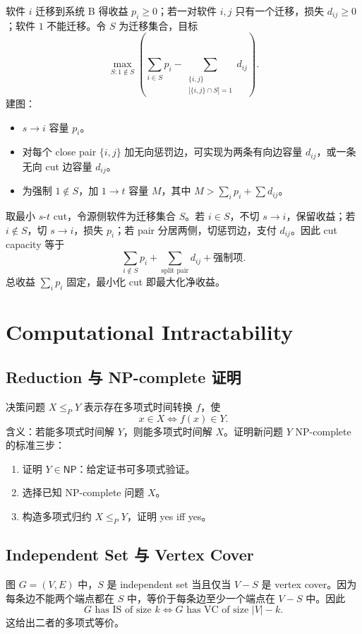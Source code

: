 \documentclass[UTF8,a4paper,11pt]{ctexart}
\newcommand{\NP}{\mathsf{NP}}
\begin{document}
软件 $i$ 迁移到系统 B 得收益 $p_i\ge 0$；若一对软件 $i,j$ 只有一个迁移，损失 $d_{ij}\ge 0$；软件 $1$ 不能迁移。令 $S$ 为迁移集合，目标
\[
\max_{S:1\notin S}\left(\sum_{i\in S}p_i-\sum_{\substack{\{i,j\}\\ |\{i,j\}\cap S|=1}}d_{ij}\right).
\]
建图：
\begin{itemize}
  \item $s\to i$ 容量 $p_i$。
  \item 对每个 close pair $\{i,j\}$ 加无向惩罚边，可实现为两条有向边容量 $d_{ij}$，或一条无向 cut 边容量 $d_{ij}$。
  \item 为强制 $1\notin S$，加 $1\to t$ 容量 $M$，其中 $M>\sum_i p_i+\sum d_{ij}$。
\end{itemize}
取最小 $s$-$t$ cut，令源侧软件为迁移集合 $S$。若 $i\in S$，不切 $s\to i$，保留收益；若 $i\notin S$，切 $s\to i$，损失 $p_i$；若 pair 分居两侧，切惩罚边，支付 $d_{ij}$。因此 cut capacity 等于
\[
\sum_{i\notin S}p_i+\sum_{\text{split pair}}d_{ij}+\text{强制项}.
\]
总收益 $\sum_i p_i$ 固定，最小化 cut 即最大化净收益。

\section{Computational Intractability}

\subsection{Reduction 与 NP-complete 证明}

决策问题 $X\le_P Y$ 表示存在多项式时间转换 $f$，使
\[
x\in X \iff f(x)\in Y.
\]
含义：若能多项式时间解 $Y$，则能多项式时间解 $X$。证明新问题 $Y$ NP-complete 的标准三步：
\begin{enumerate}
  \item 证明 $Y\in\NP$：给定证书可多项式验证。
  \item 选择已知 NP-complete 问题 $X$。
  \item 构造多项式归约 $X\le_P Y$，证明 yes iff yes。
\end{enumerate}

\subsection{Independent Set 与 Vertex Cover}

图 $G=(V,E)$ 中，$S$ 是 independent set 当且仅当 $V-S$ 是 vertex cover。因为每条边不能两个端点都在 $S$ 中，等价于每条边至少一个端点在 $V-S$ 中。因此
\[
G\text{ has IS of size }k \iff G\text{ has VC of size }|V|-k.
\]
这给出二者的多项式等价。
\end{document}
